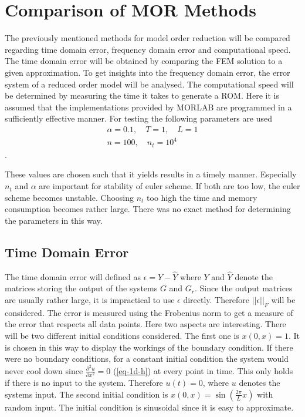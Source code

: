 \chapter{Comparison of MOR Methods} \label{analysis}
The previously mentioned methods for model order reduction will be compared regarding time domain error, frequency domain error and computational speed.
The time domain error will be obtained by comparing the FEM solution to a given approximation.
To get insights into the frequency domain error, the error system of a reduced order model will be analysed.
The computational speed will be determined by measuring the time it takes to generate a ROM.
Here it is assumed that the implementations provided by MORLAB are programmed in a sufficiently effective manner.
For testing the following parameters are used
\begin{gather}
\alpha = 0.1, \quad T = 1, \quad L = 1 \\
n = 100, \quad n_t = 10^{4}
\end{gather}
.

These values are chosen such that it yields results in a timely manner.
Especially \(n_t\) and \(\alpha\) are important for stability of euler scheme.
If both are too low, the euler scheme becomes unstable.
Choosing \(n_t\) too high the time and memory consumption becomes rather large.
There was no exact method for determining the parameters in this way.

\section{Time Domain Error}
The time domain error will defined as \(\epsilon = Y - \hat{Y}\) where \(Y\) and \(\hat{Y}\) denote the matrices storing the output of the systems \(G\) and \(G_r\).
Since the output matrices are usually rather large, it is impractical to use \(\epsilon\) directly.
Therefore  \(||\epsilon||_{F}\) will be considered.
The error is measured using the Frobenius norm to get a measure of the error that respects all data points.
Here two aspects are interesting.
There will be two different initial conditions considered.
The first one is \(x(0, x) = 1\).
It is chosen in this way to display the workings of the boundary condition.
If there were no boundary conditions, for a constant initial condition the system would never cool down since \(\frac{\partial^2 u}{\partial x^2} = 0\) (\ref{eq-1d-h}) at every point in time.
This only holds if there is no input to the system.
Therefore \(u(t) = 0\), where \(u\) denotes the systems input.
The second initial condition is \(x(0, x) = \sin(\frac{2\pi}{L}x)\) with random input.
The initial condition is sinusoidal since it is easy to approximate.
\pagebreak
